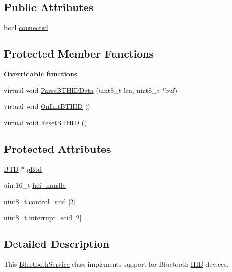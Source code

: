 \subsection*{\-Public \-Attributes}
\begin{DoxyCompactItemize}
\item 
bool \hyperlink{class_b_t_h_i_d_ab3a81823a1d8805383146a6baad6ccc4}{connected}
\end{DoxyCompactItemize}
\subsection*{\-Protected \-Member \-Functions}
\begin{Indent}{\bf \-Overridable functions}\par
\begin{DoxyCompactItemize}
\item 
virtual void \hyperlink{class_b_t_h_i_d_a4de4a1efd32000a0cf5a884456e52c7d}{\-Parse\-B\-T\-H\-I\-D\-Data} (uint8\-\_\-t len, uint8\-\_\-t $\ast$buf)
\item 
virtual void \hyperlink{class_b_t_h_i_d_a6d92c1771d643172094fcd084f418421}{\-On\-Init\-B\-T\-H\-I\-D} ()
\item 
virtual void \hyperlink{class_b_t_h_i_d_acc22bf5baaa096fe09b72c812c1134f0}{\-Reset\-B\-T\-H\-I\-D} ()
\end{DoxyCompactItemize}
\end{Indent}
\subsection*{\-Protected \-Attributes}
\begin{DoxyCompactItemize}
\item 
\hyperlink{class_b_t_d}{\-B\-T\-D} $\ast$ \hyperlink{class_b_t_h_i_d_a02c37811a4a401618caf188e744e8e3d}{p\-Btd}
\item 
uint16\-\_\-t \hyperlink{class_b_t_h_i_d_a8e4888359cda09bc7123d971bb9d8dcf}{hci\-\_\-handle}
\item 
uint8\-\_\-t \hyperlink{class_b_t_h_i_d_acf6933a4988ed9f48c6e08cc7c9b906c}{control\-\_\-scid} \mbox{[}2\mbox{]}
\item 
uint8\-\_\-t \hyperlink{class_b_t_h_i_d_a34a91f92ea32033403c2b37af92535dc}{interrupt\-\_\-scid} \mbox{[}2\mbox{]}
\end{DoxyCompactItemize}


\subsection{\-Detailed \-Description}
\-This \hyperlink{class_bluetooth_service}{\-Bluetooth\-Service} class implements support for \-Bluetooth \hyperlink{class_h_i_d}{\-H\-I\-D} devices. 

